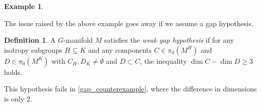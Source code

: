 \documentclass[11pt]{amsart}
\theoremstyle{definition}
\newtheorem{defn}{Definition}[section]
\newtheorem{exmp}{Example}[section]
\numberwithin{equation}{section}
\numberwithin{figure}{section}
\newcommand{\ourdefn}[1]{{\it #1}}
\begin{document}
\begin{exmp}
	
%	
\end{exmp}

The issue raised by the above example goes away if we assume a gap hypothesis.

\begin{defn}\label{gap}
A $G$-manifold $M$ satisfies the \ourdefn{weak gap hypothesis} if for any isotropy subgroups $H\subsetneq K$ and any components $C\in \pi_0(M^H)$ and $D\in \pi_0(M^K)$ with $C_H, D_K\neq \emptyset$ and $D\subset C$, the inequality $\dim C-\dim D \geq 3$ holds.
\end{defn}

This hypothesis fails in \autoref{gap_counterexample}, where the difference in dimensions is only 2.
\end{document}
